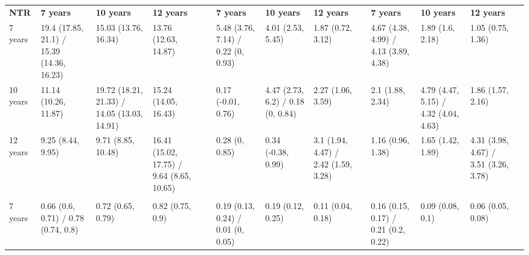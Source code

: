 \begin{tabular}{llllrlllrlllr}
  \cmidrule{2-4}\textbf{NTR}  & \textbf{7 years}                          & \textbf{10 years}                           & \textbf{12 years}                         &  & \textbf{7 years}                      & \textbf{10 years}                     & \textbf{12 years}                     &  & \textbf{7 years}                      & \textbf{10 years}                     & \textbf{12 years}                     & \\
  \cmidrule{1-4}    7 years                                    & 19.4 (17.85, 21.1) / 15.39 (14.36, 16.23) & 15.03 (13.76, 16.34)                        & 13.76 (12.63, 14.87)                      &  & 5.48 (3.76, 7.14) / 0.22 (0, 0.93)    & 4.01 (2.53, 5.45)                     & 1.87 (0.72, 3.12)                     &  & 4.67 (4.38, 4.99) / 4.13 (3.89, 4.38) & 1.89 (1.6, 2.18)                      & 1.05 (0.75, 1.36)                     & \\
  10 years                                                      & 11.14 (10.26, 11.87)                      & 19.72 (18.21, 21.33) / 14.05 (13.03, 14.91) & 15.24 (14.05, 16.43)                      &  & 0.17 (-0.01, 0.76)                    & 4.47 (2.73, 6.2) / 0.18 (0, 0.84)     & 2.27 (1.06, 3.59)                     &  & 2.1 (1.88, 2.34)                      & 4.79 (4.47, 5.15) / 4.32 (4.04, 4.63) & 1.86 (1.57, 2.16)                     & \\
  12 years                                                      & 9.25 (8.44, 9.95)                         & 9.71 (8.85, 10.48)                          & 16.41 (15.02, 17.75) / 9.64 (8.65, 10.65) &  & 0.28 (0, 0.85)                        & 0.34 (-0.38, 0.99)                    & 3.1 (1.94, 4.47) / 2.42 (1.59, 3.28)  &  & 1.16 (0.96, 1.38)                     & 1.65 (1.42, 1.89)                     & 4.31 (3.98, 4.67) / 3.51 (3.26, 3.78) & \\
                                                                & \multicolumn{3}{r}{}                      &                                             & \multicolumn{3}{c}{}                      &  & \multicolumn{3}{c}{}                  & \\
  7 years                                                       & 0.66 (0.6, 0.71) / 0.78 (0.74, 0.8)       & 0.72 (0.65, 0.79)                           & 0.82 (0.75, 0.9)                          &  & 0.19 (0.13, 0.24) / 0.01 (0, 0.05)    & 0.19 (0.12, 0.25)                     & 0.11 (0.04, 0.18)                     &  & 0.16 (0.15, 0.17) / 0.21 (0.2, 0.22)  & 0.09 (0.08, 0.1)                      & 0.06 (0.05, 0.08)                     & \\

\end{tabular}
